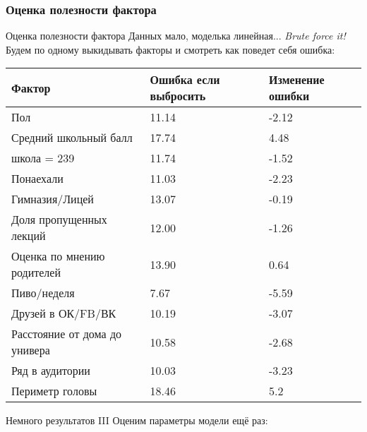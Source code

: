 \documentclass[14pt, fleqn, xcolor={dvipsnames, table}, hyperref={unicode}, babel={english,russian}, inputenc=utf8x]{beamer}
\begin{document}
\subsubsection{Оценка полезности фактора}
\begin{frame}{Оценка полезности фактора}
Данных мало, моделька линейная... {\em Brute force it!}
Будем по одному выкидывать факторы и смотреть как поведет себя ошибка:
\footnotesize
\begin{tabular}{l|l|l}
Фактор & \multicolumn{1}{p{5em}|}{Ошибка если выбросить} & Изменение ошибки \\
\hline
Пол & 11.14 & -2.12 \\
Средний школьный балл & 17.74 & 4.48 \\
школа = 239 & 11.74 & -1.52 \\
Понаехали & 11.03 & -2.23 \\
Гимназия/Лицей & 13.07 & -0.19 \\
Доля пропущенных лекций & 12.00 & -1.26 \\
Оценка по мнению родителей & 13.90 & 0.64 \\
Пиво/неделя & 7.67 & -5.59 \\
Друзей в ОК/FB/ВК & 10.19 & -3.07 \\
Расстояние от дома до универа & 10.58 & -2.68 \\
Ряд в аудитории & 10.03 & -3.23 \\
Периметр головы & 18.46 & 5.2 \\
\end{tabular}
\end{frame}

\begin{frame}{Немного результатов III}
Оценим параметры модели ещё раз:
\footnotesize
{}
\end{frame}
\end{document}
